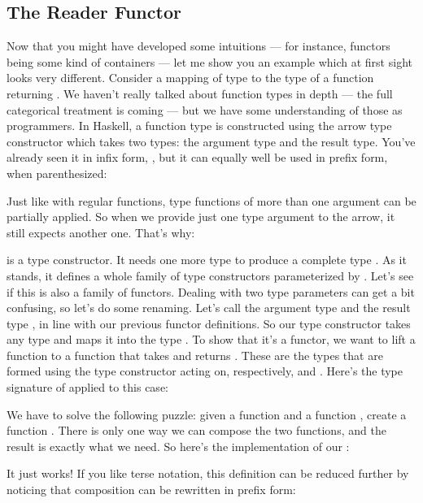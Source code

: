 \subsection{The Reader Functor}

Now that you might have developed some intuitions --- for instance,
functors being some kind of containers --- let me show you an example
which at first sight looks very different. Consider a mapping of type
 to the type of a function returning . We haven't
really talked about function types in depth --- the full categorical
treatment is coming --- but we have some understanding of those as
programmers. In Haskell, a function type is constructed using the arrow
type constructor \code{(->)} which takes two types: the
argument type and the result type. You've already seen it in infix form,
, but it can equally well be used in prefix
form, when parenthesized:

Just like with regular functions, type functions of more than one
argument can be partially applied. So when we provide just one type
argument to the arrow, it still expects another one. That's why:

is a type constructor. It needs one more type  to produce a
complete type . As it stands, it defines a
whole family of type constructors parameterized by . Let's see
if this is also a family of functors. Dealing with two type parameters
can get a bit confusing, so let's do some renaming. Let's call the
argument type  and the result type , in line with
our previous functor definitions. So our type constructor takes any type
 and maps it into the type . To show
that it's a functor, we want to lift a function
 to a function that takes
 and returns . These
are the types that are formed using the type constructor
 acting on, respectively,  and
. Here's the type signature of  applied to this
case:

We have to solve the following puzzle: given a function
 and a function
, create a function
. There is only one way we can compose the two
functions, and the result is exactly what we need. So here's the
implementation of our :

It just works! If you like terse notation, this definition can be
reduced further by noticing that composition can be rewritten in prefix
form:

